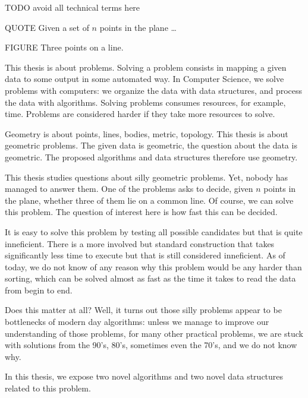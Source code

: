 
TODO avoid all technical terms here

QUOTE Given a set of \(n\) points in the plane \dots

FIGURE Three points on a line.

This thesis is about problems.
Solving a problem consists in mapping a given data to some output in some
automated way.
In Computer Science, we solve problems with computers: we organize the data
with data structures, and process the data with algorithms.
%
Solving problems consumes resources, for example, time.
Problems are considered harder if they take more resources to solve.

Geometry is about points, lines, bodies, metric, topology.
%
This thesis is about geometric problems. The given data is geometric, the
question about the data is geometric. The proposed algorithms and data
structures therefore use geometry.

This thesis studies questions about silly geometric problems. Yet, nobody
has managed to answer them. One of the problems asks to decide, given \(n\) points in the plane,
whether three of them lie on a common line. Of course, we can solve this
problem. The question of interest here is how fast this can be decided.

It is easy to solve this problem by testing all possible candidates but that is
quite inneficient. There is a
more involved but standard construction that takes significantly less time to
execute but that is still considered inneficient. As of today, we do not know of
any reason why this problem would be any harder than sorting, which can be
solved almost as fast as the time it takes to read the data from begin to end.

Does this matter at all? Well, it turns out those silly problems appear to
be bottlenecks of modern day algorithms: unless we manage to improve our
understanding of those problems, for many other practical problems,
we are stuck with solutions from the 90's, 80's, sometimes even the 70's, and
we do not know why.

In this thesis, we expose two novel algorithms and two novel data
structures related to this problem.
